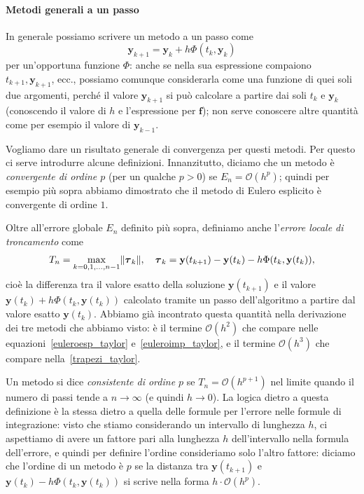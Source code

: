 \documentclass[a4paper]{report}
\DeclarePairedDelimiter{\norm}{\lVert}{\rVert}
\theoremstyle{definition}
\theoremstyle{remark}
\newcommand{\y}{\mathbf{y}}
\newcommand{\f}{\mathbf{f}}
\newcommand{\checkkey}[1]{%
        \ifstrequal{#1}{inf}{\setbool{showcontent}{true}}{}%
    }
\newenvironment{conditional}[1][]{%
        \setbool{showcontent}{false}%
        \forcsvlist\checkkey{#1}%
        \ifbool{showcontent}{\begingroup}{\expandafter\comment}%
    }{%
        \ifbool{showcontent}{\endgroup}{\expandafter\endcomment}%
    }
\newcommand{\checkkey}[1]{%
        \ifstrequal{#1}{ich}{\setbool{showcontent}{true}}{}%
    }
\newenvironment{conditional}[1][]{%
        \setbool{showcontent}{false}%
        \forcsvlist\checkkey{#1}%
        \ifbool{showcontent}{\begingroup}{\expandafter\comment}%
    }{%
        \ifbool{showcontent}{\endgroup}{\expandafter\endcomment}%
    }
\begin{document}
\begin{conditional}[ich]
\paragraph{Metodi generali a un passo}

In generale possiamo scrivere un metodo a un passo come
\begin{equation} \label{metodoaunpasso}
    \y_{k+1} = \y_k + h\Phi(t_k,\y_k)    
\end{equation}
per un'opportuna funzione $\Phi$: anche se nella sua espressione compaiono $t_{k+1},\y_{k+1}$, ecc., possiamo comunque considerarla come una funzione di quei soli due argomenti, perché il valore $\y_{k+1}$ si può calcolare a partire dai soli $t_k$ e $\y_k$ (conoscendo il valore di $h$ e l'espressione per $\f$); non serve conoscere altre quantità come per esempio il valore di $\y_{k-1}$.

Vogliamo dare un risultato generale di convergenza per questi metodi. Per questo ci serve introdurre alcune definizioni. Innanzitutto, diciamo che un metodo è \emph{convergente di ordine $p$} (per un qualche $p>0$) se $E_n = \mathcal{O}(h^p)$; quindi per esempio più sopra abbiamo dimostrato che il metodo di Eulero esplicito è convergente di ordine $1$.

Oltre all'errore globale $E_n$ definito più sopra, definiamo anche l'\emph{errore locale di troncamento} come
\[
T_n = \max_{k=0,1,\dots,n-1} \norm{\boldsymbol{\tau}_k}, \quad \boldsymbol{\tau}_k = \y(t_{k+1}) - \y(t_k) - h\Phi(t_k, \y(t_k)) ,
\]
cioè la differenza tra il valore esatto della soluzione $\y(t_{k+1})$ e il valore $\y(t_k) + h\Phi(t_k, \y(t_k))$ calcolato tramite un passo dell'algoritmo a partire dal valore esatto $\y(t_k)$. Abbiamo già incontrato questa quantità nella derivazione dei tre metodi che abbiamo visto: è il termine $\mathcal{O}(h^2)$ che compare nelle equazioni~\eqref{euleroesp_taylor} e~\eqref{euleroimp_taylor}, e il termine $\mathcal{O}(h^3)$ che compare nella~\eqref{trapezi_taylor}.

Un metodo si dice \emph{consistente di ordine $p$} se $T_n = \mathcal{O}(h^{p+1})$ nel limite quando il numero di passi tende a $n\to \infty$ (e quindi $h \to 0$). La logica dietro a questa definizione è la stessa dietro a quella delle formule per l'errore nelle formule di integrazione: visto che stiamo considerando un intervallo di lunghezza $h$, ci aspettiamo di avere un fattore pari alla lunghezza $h$ dell'intervallo nella formula dell'errore, e quindi per definire l'ordine consideriamo solo l'altro fattore: diciamo che l'ordine di un metodo è $p$ se la distanza tra $\y(t_{k+1})$ e $\y(t_k) - h\Phi(t_k, \y(t_k))$ si scrive nella forma $h \cdot \mathcal{O}(h^p)$.


\end{conditional}
\end{document}
